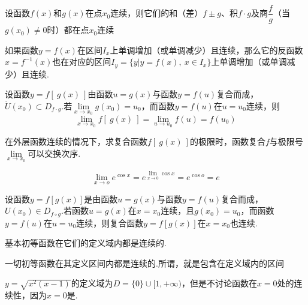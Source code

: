 \begin{theorem}
	设函数\( f(x) \)和\( g(x) \)在点\( x_{0} \)连续，则它们的和（差）\( f \pm g \)、积\( f \cdot g \)及商\( \dfrac{f}{g} \)（当\( g(x_{0}) \neq 0 \)时）都在点\( x_{0} \)连续
\end{theorem}

\begin{theorem}
	如果函数\( y = f(x) \)在区间\( I_{x} \)上单调增加（或单调减少）且连续，那么它的反函数\( x = f^{-1}(x) \)也在对应的区间\( I_{y} = \{y | y = f(x),\ x\in I_{x}\} \)上单调增加（或单调减少）且连续.
\end{theorem}

\begin{theorem}
	设函数\( y =f[\ g(x)\ ] \)由函数\( u = g(x) \)与函数\( y = f(u) \)复合而成，\( \mathring{U}(x_{0}) \subset D_{f \cdot g} \).若\( \lim\limits_{x \to x_{0}}g(x_{0}) = u_{0} \)，而函数\( y = f(u) \)在\( u = u_{0} \)连续，则
	\[ \lim\limits_{x \to x_{0}}f[\ g(x)\ ] = \lim\limits_{u \to u_{0}}f(u) = f(u_{0}) \]
\end{theorem}

\begin{note}
	在外层函数连续的情况下，求复合函数\( f[\ g(x)\ ] \)的极限时，函数复合\( f \)与极限号\( \lim\limits_{x \to x_{0}} \)可以交换次序.
	\begin{example}
		\[ \lim\limits_{x \to o}e^{\cos x} = e^{\lim\limits_{x \to 0}\cos x} = e^{\cos o} = e \]
	\end{example}
\end{note}

\begin{theorem}
	设函数\( y = f[g(x)] \)是由函数\( u = g(x) \)与函数\( y = f(u) \)复合而成，\( U(x_{0}) \in D_{f \circ g} \).若函数\( u = g(x) \)在\( x = x_{0} \)连续，且\( g(x_{0}) = u_{0} \)，而函数\( y = f(u) \)在\( u = u_{0} \)连续，则复合函数\( y = f[g(x)] \)在\( x = x_{0} \)也连续.
\end{theorem}

\begin{conclusion}
	基本初等函数在它们的定义域内都是连续的.
\end{conclusion}

\begin{conclusion}
	一切初等函数在其定义区间内都是连续的.所谓，就是包含在定义域内的区间
\end{conclusion}

\begin{example}
	\( y = \sqrt{x^{2}(x - 1)} \)的定义域为\( D = \{0\}\cup [1, +\infty) \)，但是不讨论函数在\(  x = 0 \)处的连续性，因为\( x = 0 \)是.
\end{example}

